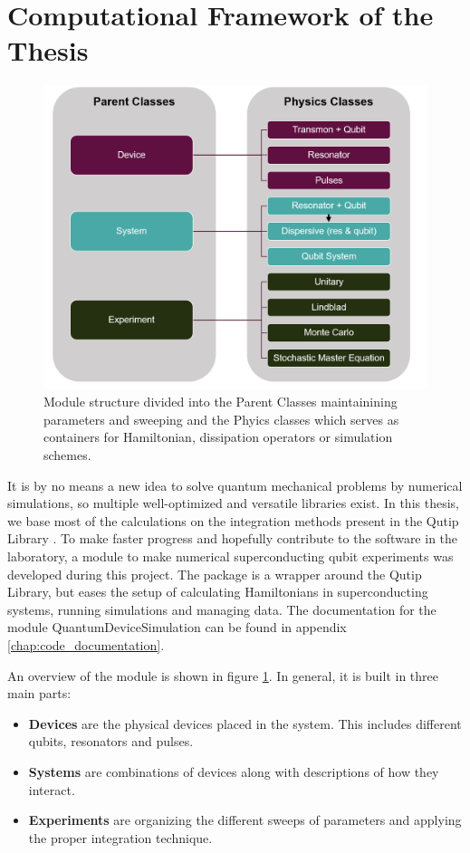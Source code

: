 \section{Computational Framework of the Thesis}
\begin{figure}[h]
    \centering
    \includegraphics[width = 1.0 \textwidth]{Figs/Sections/Introduction/module_v2.png}
    \caption{Module structure divided into the Parent Classes maintainining parameters and sweeping and the Phyics classes which serves as containers for Hamiltonian, dissipation operators or simulation schemes.}
    \label{fig:module_overview}
\end{figure}
It is by no means a new idea to solve quantum mechanical problems by numerical simulations, so multiple well-optimized and versatile libraries exist. In this thesis, we base most of the calculations on the integration methods present in the Qutip Library \cite{johansson_qutip_2012}. To make faster progress and hopefully contribute to the software in the laboratory, a module to make numerical superconducting qubit experiments was developed during this project. The package is a wrapper around the Qutip Library, but eases the setup of calculating Hamiltonians in superconducting systems, running simulations and managing data. The documentation for the module QuantumDeviceSimulation can be found in appendix \ref{chap:code_documentation}.

An overview of the module is shown in figure \ref{fig:module_overview}. In general, it is built in three main parts:
\begin{itemize}
    \item \textbf{Devices} are the physical devices placed in the system. This includes different qubits, resonators and pulses.
    \item \textbf{Systems} are combinations of devices along with descriptions of how they interact.
    \item \textbf{Experiments} are organizing the different sweeps of parameters and applying the proper integration technique. 
\end{itemize}